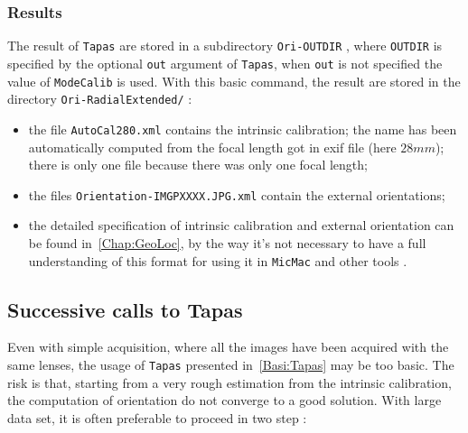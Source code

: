 \subsubsection{Results}

The result of {\tt Tapas} are stored in a subdirectory {\tt Ori-OUTDIR} ,
where {\tt OUTDIR} is specified by the optional {\tt out} argument of {\tt Tapas},
when {\tt out} is not specified the value of {\tt ModeCalib} is used.
With this basic command, the result are stored in the directory {\tt Ori-RadialExtended/} :



\begin{itemize}
   \item the file {\tt AutoCal280.xml} contains the intrinsic calibration; the name
         has been automatically computed from the focal length got in exif file (here $28 mm$);
         there is only one file because there was only one focal length;

   \item   the  files {\tt Orientation-IMGPXXXX.JPG.xml} contain the external orientations;

   \item  the detailed specification of intrinsic calibration and external orientation can
          be found in~\ref{Chap:GeoLoc}, by the way it's not necessary to have a full
          understanding of this format for using it in {\tt MicMac} and  other tools .
\end{itemize}


\subsection{Successive calls to Tapas}

\label{Succ:Call:Tapas}

Even with simple acquisition, where all the images have been acquired with
the same lenses, the usage of {\tt Tapas} presented in~\ref{Basi:Tapas} may
be too basic.  The risk is that, starting from a very rough estimation from the
intrinsic calibration, the  computation of orientation do not converge to a
good solution.
With large data set, it is often preferable to proceed in two step :

